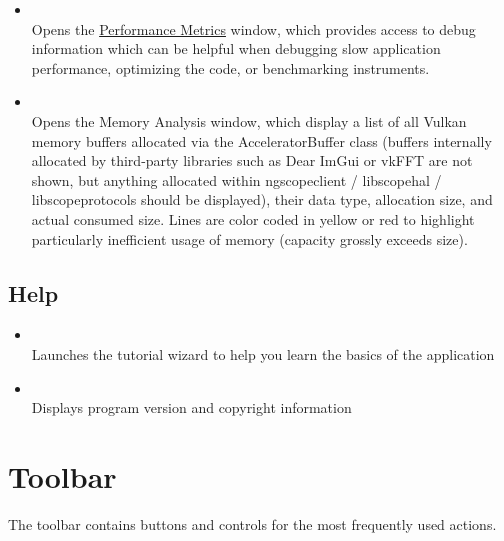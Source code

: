 \begin{itemize}
\item {}\\
Opens the \hyperref[dlg:perfemetrics]{Performance Metrics} window, which provides access to debug information which can
be helpful when debugging slow application performance, optimizing the code, or benchmarking instruments.

\item {}\\
Opens the Memory Analysis window, which display a list of all Vulkan memory buffers allocated via the AcceleratorBuffer class (buffers internally allocated by third-party libraries such as Dear ImGui or vkFFT are not shown, but anything allocated within ngscopeclient / libscopehal / libscopeprotocols should be displayed), their data type, allocation size, and actual consumed size. Lines are color coded in yellow or red to highlight particularly inefficient usage of memory (capacity grossly exceeds size).

\end{itemize}


\subsection{Help}

\begin{itemize}

\item {}\\
Launches the tutorial wizard to help you learn the basics of the application

\item {}\\
Displays program version and copyright information

\end{itemize}

\section{Toolbar}

The toolbar contains buttons and controls for the most frequently used actions.

